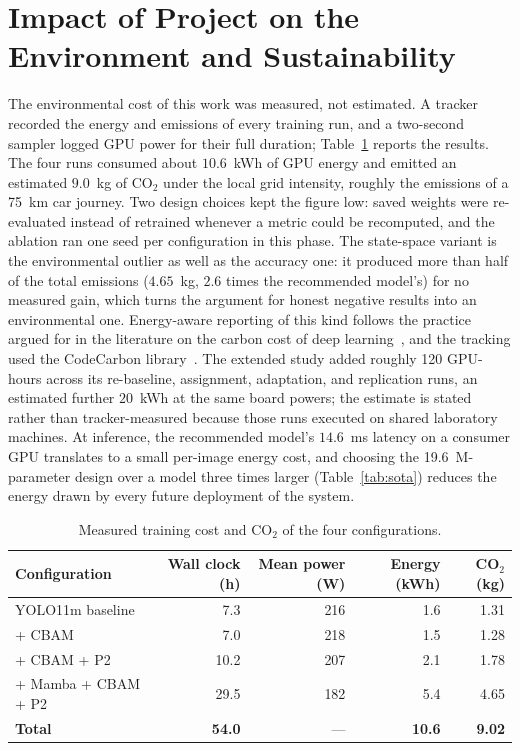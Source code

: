 \section{Impact of Project on the Environment and Sustainability}
The environmental cost of this work was measured, not estimated. A tracker
recorded the energy and emissions of every training run, and a two-second
sampler logged GPU power for their full duration; Table~\ref{tab:carbon}
reports the results. The four runs consumed about $10.6$~kWh of GPU energy
and emitted an estimated $9.0$~kg of CO$_2$ under the local grid intensity,
roughly the emissions of a 75~km car journey. Two design choices kept the
figure low: saved weights were re-evaluated instead of retrained whenever a
metric could be recomputed, and the ablation ran one seed per configuration
in this phase. The state-space variant is the environmental outlier as well
as the accuracy one: it produced more than half of the total emissions
($4.65$~kg, $2.6$ times the recommended model's) for no measured gain, which
turns the argument for honest negative results into an environmental one.
Energy-aware reporting of this kind follows the practice argued for in the
literature on the carbon cost of deep learning~\cite{strubell2019energy}, and
the tracking used the CodeCarbon library~\cite{codecarbon}. The extended
study added roughly 120 GPU-hours across its re-baseline, assignment,
adaptation, and replication runs, an estimated further $20$~kWh at the same
board powers; the estimate is stated rather than tracker-measured because
those runs executed on shared laboratory machines. At inference, the
recommended model's $14.6$~ms latency on a consumer GPU translates to a small
per-image energy cost, and choosing the 19.6~M-parameter design over a model
three times larger (Table~\ref{tab:sota}) reduces the energy drawn by every
future deployment of the system.

\begin{table}[tbp]
  \centering
  \caption{Measured training cost and CO$_2$ of the four configurations.}
  \label{tab:carbon}
  \begin{tabular}{@{}l r r r r@{}}
    \toprule
    Configuration & Wall clock (h) & Mean power (W) & Energy (kWh) & CO$_2$ (kg) \\
    \midrule
    YOLO11m baseline    & 7.3  & 216 & 1.6 & 1.31 \\
    + CBAM              & 7.0  & 218 & 1.5 & 1.28 \\
    + CBAM + P2         & 10.2 & 207 & 2.1 & 1.78 \\
    + Mamba + CBAM + P2 & 29.5 & 182 & 5.4 & 4.65 \\
    \midrule
    \textbf{Total}      & \textbf{54.0} & --- & \textbf{10.6} & \textbf{9.02} \\
    \bottomrule
  \end{tabular}
\end{table}


